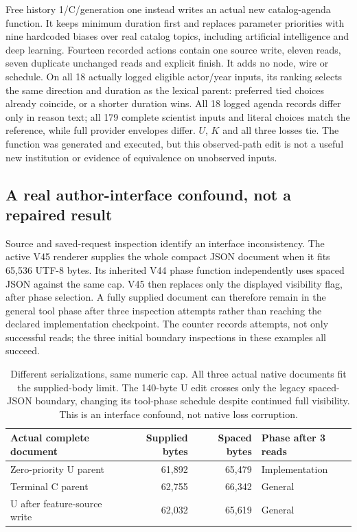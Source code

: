 Free history 1/C/generation one instead writes an actual new catalog-agenda
function. It keeps minimum duration first and replaces parameter priorities
with nine hardcoded biases over real catalog topics, including artificial
intelligence and deep learning. Fourteen recorded actions contain one source
write, eleven reads, seven duplicate unchanged reads and explicit finish.
It adds no node, wire or schedule. On all 18 actually logged eligible actor/year
inputs, its ranking selects the same direction and duration as the lexical
parent: preferred tied choices already coincide, or a shorter duration wins.
All 18 logged agenda records differ only in reason text; all 179 complete
scientist inputs and literal choices match the reference, while full provider
envelopes differ. $U$, $K$ and all three losses tie. The function was generated
and executed, but this observed-path edit is not a useful new institution or
evidence of equivalence on unobserved inputs.

\subsection{A real author-interface confound, not a repaired result}
\label{sec:native-author-visibility}
Source and saved-request inspection identify an interface inconsistency.
The active V45 renderer supplies the whole compact JSON document when it
fits 65,536 UTF-8 bytes. Its inherited V44 phase function independently uses
spaced JSON against the same cap. V45 then replaces only the displayed
visibility flag, after phase selection. A fully supplied document can therefore
remain in the general tool phase after three inspection attempts rather
than reaching the declared implementation checkpoint. The counter records
attempts, not only successful reads; the three initial boundary inspections
in these examples all succeed.

\begin{table}[t]
\centering\small
\setlength{\tabcolsep}{5pt}
\begin{tabular}{lrrl}
\toprule
Actual complete document & Supplied bytes & Spaced bytes & Phase after 3 reads\\
\midrule
Zero-priority U parent & 61,892 & 65,479 & Implementation\\
Terminal C parent & 62,755 & 66,342 & General\\
U after feature-source write & 62,032 & 65,619 & General\\
\bottomrule
\end{tabular}
\caption{Different serializations, same numeric cap. All three actual native
documents fit the supplied-body limit. The 140-byte U edit crosses only the
legacy spaced-JSON boundary, changing its tool-phase schedule despite continued
full visibility. This is an interface confound, not native loss corruption.}
\label{tab:native-author-visibility}
\end{table}

